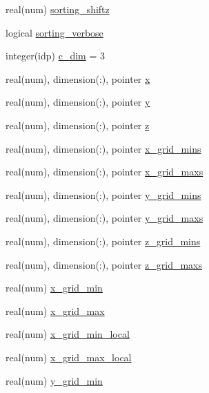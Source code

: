 \begin{DoxyCompactItemize}
\item 
real(num) \hyperlink{namespaceshared__data_a6b24bb129ab0581a9b353bd1cb663422}{sorting\+\_\+shiftz}
\item 
logical \hyperlink{namespaceshared__data_a1e3cea0f116b338483676d0bd5126c75}{sorting\+\_\+verbose}
\item 
integer(idp) \hyperlink{namespaceshared__data_a9dcd30bdab987f8957482cbd80ba40b3}{c\+\_\+dim} = 3
\item 
real(num), dimension(\+:), pointer \hyperlink{namespaceshared__data_a5a1b9ce71c6bcfbe478783cc7a5e4d7d}{x}
\item 
real(num), dimension(\+:), pointer \hyperlink{namespaceshared__data_acdc008c8a2a09f5f45b09e3f93aa04cf}{y}
\item 
real(num), dimension(\+:), pointer \hyperlink{namespaceshared__data_a2094b23a08f2ff99add0a52c71d13b04}{z}
\item 
real(num), dimension(\+:), pointer \hyperlink{namespaceshared__data_ab595b2b077b3dd6067602742e089c333}{x\+\_\+grid\+\_\+mins}
\item 
real(num), dimension(\+:), pointer \hyperlink{namespaceshared__data_a486820ed6ed463bc8084e37890eb105e}{x\+\_\+grid\+\_\+maxs}
\item 
real(num), dimension(\+:), pointer \hyperlink{namespaceshared__data_a54dff3f43983b04af43c4eb2d91dea38}{y\+\_\+grid\+\_\+mins}
\item 
real(num), dimension(\+:), pointer \hyperlink{namespaceshared__data_ad3b97b7b23eb4f1708bf6934787c3bc9}{y\+\_\+grid\+\_\+maxs}
\item 
real(num), dimension(\+:), pointer \hyperlink{namespaceshared__data_a7888fecc3fc8288475a70c8cec55313e}{z\+\_\+grid\+\_\+mins}
\item 
real(num), dimension(\+:), pointer \hyperlink{namespaceshared__data_a0e3e23f798e7e32d6ae0684ffa41a089}{z\+\_\+grid\+\_\+maxs}
\item 
real(num) \hyperlink{namespaceshared__data_a76d3dbdf07d1cb5aed88b436a613a6f6}{x\+\_\+grid\+\_\+min}
\item 
real(num) \hyperlink{namespaceshared__data_a109ff2adf267448d4110d7618c16ae54}{x\+\_\+grid\+\_\+max}
\item 
real(num) \hyperlink{namespaceshared__data_a12ab3a40a19df149a5d322939704a393}{x\+\_\+grid\+\_\+min\+\_\+local}
\item 
real(num) \hyperlink{namespaceshared__data_ad2be7fb0274c89536c91025c7db88b50}{x\+\_\+grid\+\_\+max\+\_\+local}
\item 
real(num) \hyperlink{namespaceshared__data_a427f8d5d09444c1a0e5a4cfac1821143}{y\+\_\+grid\+\_\+min}

\end{DoxyCompactItemize}
